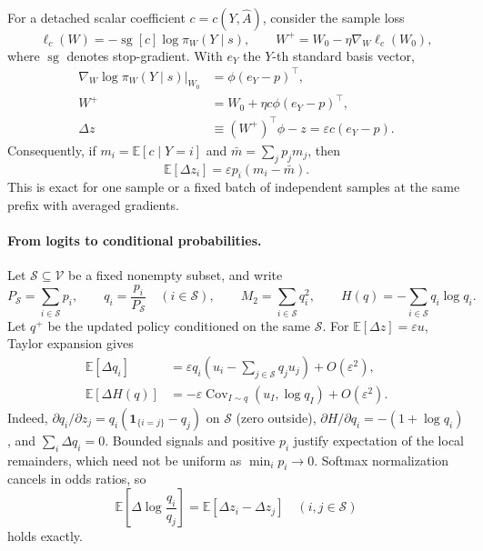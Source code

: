 For a detached scalar coefficient $c=c(Y,\widehat A)$, consider the
sample loss
\begin{equation}
 \ell_c(W)=-\operatorname{sg}[c]\log\pi_W(Y\mid s),
 \qquad W^+=W_0-\eta\nabla_W\ell_c(W_0),
 \label{eq:dyn-generic-loss}
\end{equation}
where $\operatorname{sg}$ denotes stop-gradient. With $e_Y$ the $Y$-th
standard basis vector,
\begin{align}
 \nabla_W\log\pi_W(Y\mid s)\big|_{W_0}
 &=\phi(e_Y-p)^\top, \nonumber\\
 W^+&=W_0+\eta c\phi(e_Y-p)^\top, \nonumber\\
 \Delta z&\equiv (W^+)^\top\phi-z
       =\varepsilon c(e_Y-p).
 \label{eq:dyn-generic-update}
\end{align}
Consequently, if $m_i=\mathbb E[c\mid Y=i]$ and
$\bar m=\sum_jp_jm_j$, then
\begin{equation}
 \mathbb E[\Delta z_i]=\varepsilon p_i(m_i-\bar m).
 \label{eq:dyn-generic-mean}
\end{equation}
This is exact for one sample or a fixed batch of independent samples at
the same prefix with averaged gradients.

\paragraph{From logits to conditional probabilities.}
Let $\mathcal S\subseteq\mathcal V$ be a fixed nonempty subset, and write
\begin{equation}
 P_{\mathcal S}=\sum_{i\in\mathcal S}p_i,\qquad
 q_i=\frac{p_i}{P_{\mathcal S}}\quad(i\in\mathcal S),\qquad
 M_2=\sum_{i\in\mathcal S}q_i^2,\qquad
 H(q)=-\sum_{i\in\mathcal S}q_i\log q_i.
 \label{eq:dyn-conditional}
\end{equation}
Let $q^+$ be the updated policy conditioned on the same $\mathcal S$.
For $\mathbb E[\Delta z]=\varepsilon u$, Taylor expansion gives
\begin{align}
 \mathbb E[\Delta q_i]
 &=\varepsilon q_i\left(u_i-\sum_{j\in\mathcal S}q_ju_j\right)
     +O(\varepsilon^2),
 \label{eq:dyn-conditional-drift}\\
 \mathbb E[\Delta H(q)]
 &=-\varepsilon\operatorname{Cov}_{I\sim q}(u_I,\log q_I)
     +O(\varepsilon^2).
 \label{eq:dyn-entropy-drift}
\end{align}
Indeed, $\partial q_i/\partial z_j=q_i(\mathbf 1_{\{i=j\}}-q_j)$ on
$\mathcal S$ (zero outside), $\partial H/\partial q_i=-(1+\log q_i)$,
and $\sum_i\Delta q_i=0$. Bounded signals and positive $p_i$ justify
expectation of the local remainders, which need not be uniform as
$\min_i p_i\to0$. Softmax normalization cancels in odds ratios, so
\begin{equation}
 \mathbb E\left[\Delta\log\frac{q_i}{q_j}\right]
 =\mathbb E[\Delta z_i-\Delta z_j]
 \quad (i,j\in\mathcal S)
 \label{eq:dyn-exact-odds}
\end{equation}
holds exactly.

